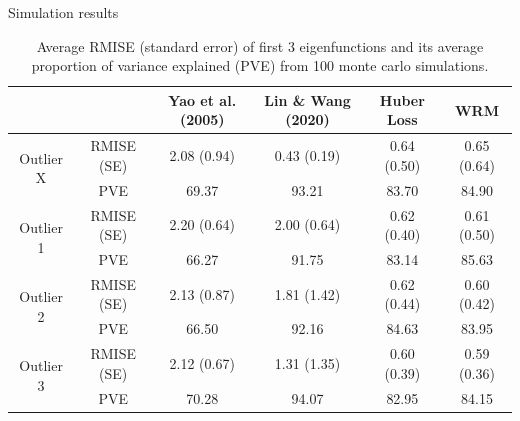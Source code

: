 \documentclass[9pt]{beamer}
\begin{document}
\begin{frame}[allowframebreaks]{Simulation results}
 
     \pagebreak
	 \vspace*{0pt}
	 \begin{table}[ht]
	 	\footnotesize
	 	\centering
	 	\tabcolsep=4.5pt
	 	\begin{tabular}{cccccc}
	 		\hline\hline
	 		& & Yao et al. (2005) & Lin \& Wang (2020) & Huber Loss & WRM \\ 
	 		\hline
	 		\multirow{2}{*}{Outlier X} & RMISE (SE) & 2.08 (0.94) & 0.43 (0.19) & 0.64 (0.50) & 0.65 (0.64) \\ 
	 								   & PVE & 69.37 & 93.21 & 83.70 & 84.90 \\ 
	 		\hline
	 		\multirow{2}{*}{Outlier 1} & RMISE (SE) & 2.20 (0.64) & 2.00 (0.64) & 0.62 (0.40) & 0.61 (0.50) \\ 
							 		   & PVE & 66.27 & 91.75 & 83.14 & 85.63 \\ 
	 		\hline
	 		\multirow{2}{*}{Outlier 2} & RMISE (SE) & 2.13 (0.87) & 1.81 (1.42) & 0.62 (0.44) & 0.60 (0.42) \\ 
	 								   & PVE & 66.50 & 92.16 & 84.63 & 83.95 \\ 
	 		\hline
	 		\multirow{2}{*}{Outlier 3} & RMISE (SE) & 2.12 (0.67) & 1.31 (1.35) & 0.60 (0.39) & 0.59 (0.36) \\ 
	 								   & PVE & 70.28 & 94.07 & 82.95 & 84.15 \\ 
	 		\hline\hline
	 	\end{tabular}
	 	\caption{Average RMISE (standard error) of first 3 eigenfunctions and its average proportion of variance explained (PVE) from 100 monte carlo simulations.}\label{t3}
	 \end{table}
\end{frame}




%
\end{document}
